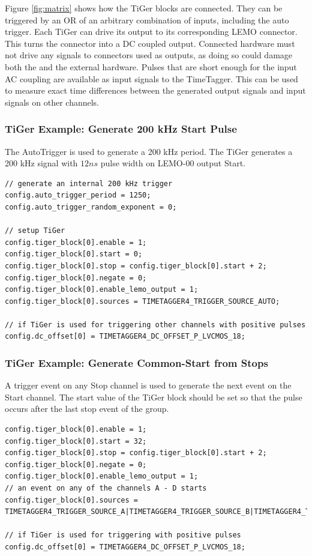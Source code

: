 		Figure \ref{fig:matrix} shows how the TiGer blocks are connected. They can be triggered by an OR of an arbitrary combination of inputs, 
		including the auto trigger. Each TiGer can drive its output to its corresponding LEMO connector. This turns the connector into a DC coupled output. 
		Connected hardware must not drive any signals to connectors used as outputs, as doing so could damage both the \deviceName and the external hardware.
		Pulses that are short enough for the input AC coupling are available as input signals to the TimeTagger. 
		This can be used to measure exact time differences between the generated output signals and input signals on other channels.

		
		\subsubsection{TiGer Example: Generate 200 kHz Start Pulse}
		The AutoTrigger is used to generate a 200 kHz period. The TiGer generates a 200 kHz signal with $12 ns$ pulse width on LEMO-00 output Start.
\begin{lstlisting}[frame=tlrb]
// generate an internal 200 kHz trigger
config.auto_trigger_period = 1250;
config.auto_trigger_random_exponent = 0;

// setup TiGer
config.tiger_block[0].enable = 1;
config.tiger_block[0].start = 0;
config.tiger_block[0].stop = config.tiger_block[0].start + 2;
config.tiger_block[0].negate = 0;
config.tiger_block[0].enable_lemo_output = 1;
config.tiger_block[0].sources = TIMETAGGER4_TRIGGER_SOURCE_AUTO;

// if TiGer is used for triggering other channels with positive pulses
config.dc_offset[0] = TIMETAGGER4_DC_OFFSET_P_LVCMOS_18; 
\end{lstlisting}

	\subsubsection{TiGer Example: Generate Common-Start from Stops}
	A trigger event on any Stop channel is used to generate the next event on the Start channel. 
	The start value of the TiGer block should be set so that the pulse occurs after the last stop event of the group.
\begin{lstlisting}[frame=tlrb]
config.tiger_block[0].enable = 1;
config.tiger_block[0].start = 32;
config.tiger_block[0].stop = config.tiger_block[0].start + 2;
config.tiger_block[0].negate = 0;
config.tiger_block[0].enable_lemo_output = 1;
// an event on any of the channels A - D starts 
config.tiger_block[0].sources = TIMETAGGER4_TRIGGER_SOURCE_A|TIMETAGGER4_TRIGGER_SOURCE_B|TIMETAGGER4_TRIGGER_SOURCE_C|TIMETAGGER4_TRIGGER_SOURCE_D;

// if TiGer is used for triggering with positive pulses
config.dc_offset[0] = TIMETAGGER4_DC_OFFSET_P_LVCMOS_18; 
\end{lstlisting}
	
